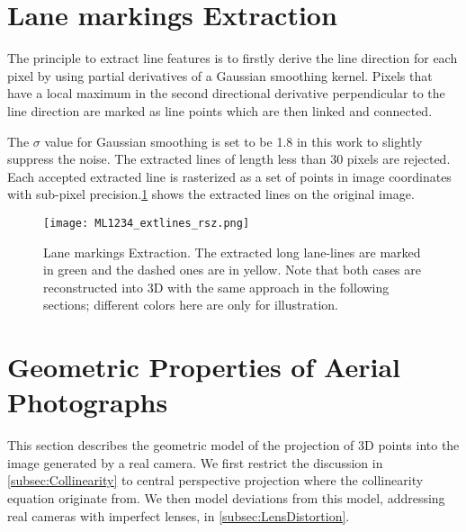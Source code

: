 \clearpage

\section{Lane markings Extraction}
\label{sec:LineExtraction}

The principle to extract line features is to firstly derive the line direction for each pixel by using partial derivatives of a Gaussian smoothing kernel. Pixels that have a local maximum in the second directional derivative perpendicular to the line direction are marked as line points which are then linked and connected.

The $\sigma$ value for Gaussian smoothing is set to be 1.8 in this work to slightly suppress the noise. The extracted lines of length less than 30 pixels are rejected. Each accepted extracted line is rasterized as a set of points in image coordinates with sub-pixel precision.\cref{fig:LineExtraction} shows the extracted lines on the original image.
\begin{figure}
  \centering
  \texttt{[image: ML1234\_extlines\_rsz.png]}
  \caption{Lane markings Extraction. The extracted long lane-lines are marked in green and the dashed ones are in yellow.  Note that both cases are reconstructed into 3D with the same approach in the following sections; different colors here are only for illustration.}
  \label{fig:LineExtraction}
\end{figure}

\section{Geometric Properties of Aerial Photographs}
\label{sec:Geometry}

This section describes the geometric model of the projection of 3D points into the image generated by a real camera. We first restrict the discussion in \cref{subsec:Collinearity} to central perspective projection where the collinearity equation originate from. We then model deviations from this model, addressing real cameras with imperfect lenses, in \cref{subsec:LensDistortion}.

